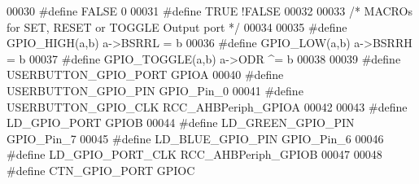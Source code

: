 \begin{DoxyCode}
00030 \textcolor{preprocessor}{#}\textcolor{preprocessor}{define} \textcolor{preprocessor}{FALSE} 0
00031 \textcolor{preprocessor}{#}\textcolor{preprocessor}{define} \textcolor{preprocessor}{TRUE} \textcolor{preprocessor}{!}FALSE
00032 
00033 \textcolor{comment}{/* MACROs for SET, RESET or TOGGLE Output port */}
00034 
00035 \textcolor{preprocessor}{#}\textcolor{preprocessor}{define} \textcolor{preprocessor}{GPIO\_HIGH}\textcolor{preprocessor}{(}\textcolor{preprocessor}{a}\textcolor{preprocessor}{,}\textcolor{preprocessor}{b}\textcolor{preprocessor}{)}      \textcolor{preprocessor}{a}\textcolor{preprocessor}{->}\textcolor{preprocessor}{BSRRL} \textcolor{preprocessor}{=} \textcolor{preprocessor}{b}
00036 \textcolor{preprocessor}{#}\textcolor{preprocessor}{define} \textcolor{preprocessor}{GPIO\_LOW}\textcolor{preprocessor}{(}\textcolor{preprocessor}{a}\textcolor{preprocessor}{,}\textcolor{preprocessor}{b}\textcolor{preprocessor}{)}       \textcolor{preprocessor}{a}\textcolor{preprocessor}{->}\textcolor{preprocessor}{BSRRH} \textcolor{preprocessor}{=} \textcolor{preprocessor}{b}
00037 \textcolor{preprocessor}{#}\textcolor{preprocessor}{define} \textcolor{preprocessor}{GPIO\_TOGGLE}\textcolor{preprocessor}{(}\textcolor{preprocessor}{a}\textcolor{preprocessor}{,}\textcolor{preprocessor}{b}\textcolor{preprocessor}{)}    \textcolor{preprocessor}{a}\textcolor{preprocessor}{->}\textcolor{preprocessor}{ODR} \textcolor{preprocessor}{^=} \textcolor{preprocessor}{b}
00038 
00039 \textcolor{preprocessor}{#}\textcolor{preprocessor}{define} \textcolor{preprocessor}{USERBUTTON\_GPIO\_PORT}    GPIOA
00040 \textcolor{preprocessor}{#}\textcolor{preprocessor}{define} \textcolor{preprocessor}{USERBUTTON\_GPIO\_PIN}     \textcolor{preprocessor}{GPIO\_Pin\_0}
00041 \textcolor{preprocessor}{#}\textcolor{preprocessor}{define} \textcolor{preprocessor}{USERBUTTON\_GPIO\_CLK}     \textcolor{preprocessor}{RCC\_AHBPeriph\_GPIOA}
00042 
00043 \textcolor{preprocessor}{#}\textcolor{preprocessor}{define} \textcolor{preprocessor}{LD\_GPIO\_PORT}        GPIOB
00044 \textcolor{preprocessor}{#}\textcolor{preprocessor}{define} \textcolor{preprocessor}{LD\_GREEN\_GPIO\_PIN}       \textcolor{preprocessor}{GPIO\_Pin\_7}
00045 \textcolor{preprocessor}{#}\textcolor{preprocessor}{define} \textcolor{preprocessor}{LD\_BLUE\_GPIO\_PIN}             \textcolor{preprocessor}{GPIO\_Pin\_6}
00046 \textcolor{preprocessor}{#}\textcolor{preprocessor}{define} \textcolor{preprocessor}{LD\_GPIO\_PORT\_CLK}             \textcolor{preprocessor}{RCC\_AHBPeriph\_GPIOB}
00047 
00048 \textcolor{preprocessor}{#}\textcolor{preprocessor}{define} \textcolor{preprocessor}{CTN\_GPIO\_PORT}           GPIOC

\end{DoxyCode}

